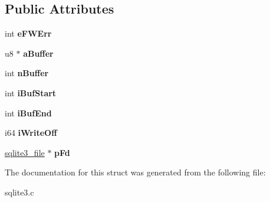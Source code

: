 \subsection*{Public Attributes}
\begin{DoxyCompactItemize}
\item 
int {\bfseries e\+F\+W\+Err}\hypertarget{structPmaWriter_a3d74aff37c8abafd22ec8f8159d08725}{}\label{structPmaWriter_a3d74aff37c8abafd22ec8f8159d08725}

\item 
u8 $\ast$ {\bfseries a\+Buffer}\hypertarget{structPmaWriter_ae53ada27501eb89a45409db4776f3b23}{}\label{structPmaWriter_ae53ada27501eb89a45409db4776f3b23}

\item 
int {\bfseries n\+Buffer}\hypertarget{structPmaWriter_a5d8e651696b33ff6318e7d8473ee9e1b}{}\label{structPmaWriter_a5d8e651696b33ff6318e7d8473ee9e1b}

\item 
int {\bfseries i\+Buf\+Start}\hypertarget{structPmaWriter_ae77a80d66a5f3d40cd5d57861a455281}{}\label{structPmaWriter_ae77a80d66a5f3d40cd5d57861a455281}

\item 
int {\bfseries i\+Buf\+End}\hypertarget{structPmaWriter_ab15d816e53fb4496dd1e59094d4839a6}{}\label{structPmaWriter_ab15d816e53fb4496dd1e59094d4839a6}

\item 
i64 {\bfseries i\+Write\+Off}\hypertarget{structPmaWriter_ad45a9271cbcdd0e506b81b77d2a744a5}{}\label{structPmaWriter_ad45a9271cbcdd0e506b81b77d2a744a5}

\item 
\hyperlink{structsqlite3__file}{sqlite3\+\_\+file} $\ast$ {\bfseries p\+Fd}\hypertarget{structPmaWriter_a54606c98fb9e7318a55ed59de0e55550}{}\label{structPmaWriter_a54606c98fb9e7318a55ed59de0e55550}

\end{DoxyCompactItemize}


The documentation for this struct was generated from the following file\+:\begin{DoxyCompactItemize}
\item 
sqlite3.\+c\end{DoxyCompactItemize}
